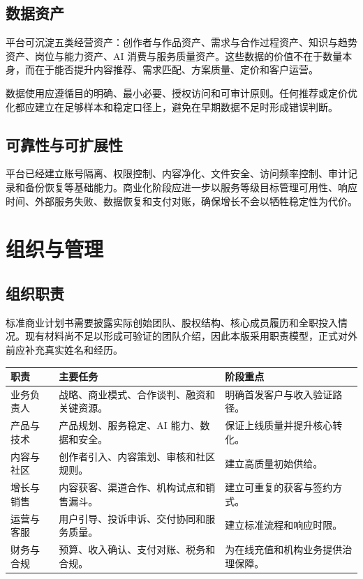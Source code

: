 \documentclass[12pt,a4paper,openany,fontset=fandol]{ctexrep}
\begin{document}
\section{数据资产}

平台可沉淀五类经营资产：创作者与作品资产、需求与合作过程资产、知识与趋势资产、岗位与能力资产、AI 消费与服务质量资产。这些数据的价值不在于数量本身，而在于能否提升内容推荐、需求匹配、方案质量、定价和客户运营。

数据使用应遵循目的明确、最小必要、授权访问和可审计原则。任何推荐或定价优化都应建立在足够样本和稳定口径上，避免在早期数据不足时形成错误判断。

\section{可靠性与可扩展性}

平台已经建立账号隔离、权限控制、内容净化、文件安全、访问频率控制、审计记录和备份恢复等基础能力。商业化阶段应进一步以服务等级目标管理可用性、响应时间、外部服务失败、数据恢复和支付对账，确保增长不会以牺牲稳定性为代价。

\chapter{组织与管理}

\section{组织职责}

标准商业计划书需要披露实际创始团队、股权结构、核心成员履历和全职投入情况。现有材料尚不足以形成可验证的团队介绍，因此本版采用职责模型，正式对外前应补充真实姓名和经历。

\begin{longtable}{p{3.2cm} p{6cm} p{4.3cm}}
\toprule
职责 & 主要任务 & 阶段重点 \\
\midrule
业务负责人 & 战略、商业模式、合作谈判、融资和关键资源。 & 明确首发客户与收入验证路径。 \\
产品与技术 & 产品规划、服务稳定、AI 能力、数据和安全。 & 保证上线质量并提升核心转化。 \\
内容与社区 & 创作者引入、内容策划、审核和社区规则。 & 建立高质量初始供给。 \\
增长与销售 & 内容获客、渠道合作、机构试点和销售漏斗。 & 建立可重复的获客与签约方式。 \\
运营与客服 & 用户引导、投诉申诉、交付协同和服务质量。 & 建立标准流程和响应时限。 \\
财务与合规 & 预算、收入确认、支付对账、税务和合规。 & 为在线充值和机构业务提供治理保障。 \\
\bottomrule
\end{longtable}
\end{document}
